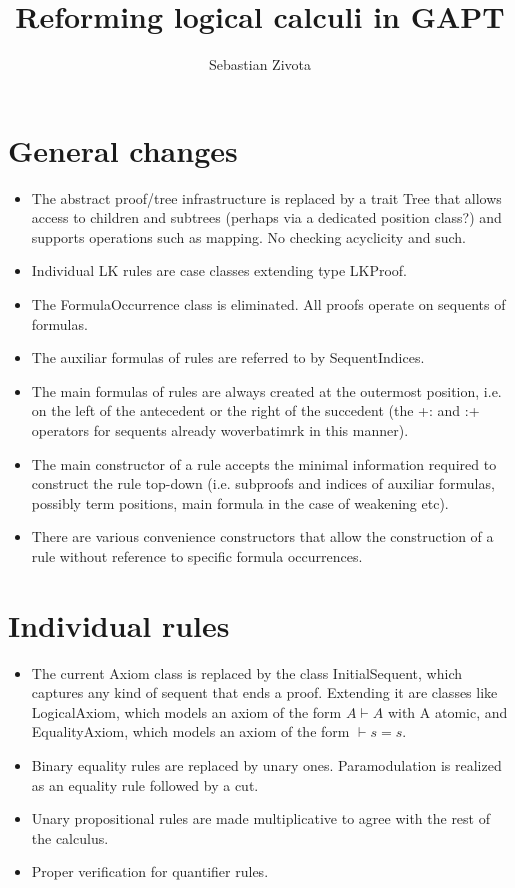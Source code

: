 \documentclass[11pt,a4paper]{article}
\title{Reforming logical calculi in GAPT}
\author{Sebastian Zivota}
\begin{document}
%
\maketitle
%
\section{General changes}
\begin{itemize}
 \item The abstract proof/tree infrastructure is replaced by a trait Tree that allows access to children and subtrees (perhaps via a dedicated position class?) and supports operations such as mapping. No checking acyclicity and such.
 \item Individual LK rules are case classes extending type LKProof.
 \item The FormulaOccurrence class is eliminated. All proofs operate on sequents of formulas.
 \item The auxiliar formulas of rules are referred to by SequentIndices.
 \item The main formulas of rules are always created at the outermost position, i.e. on the left of the antecedent or the right of the succedent (the +: and :+ operators for sequents already woverbatimrk in this manner).
 \item The main constructor of a rule accepts the minimal information required to construct the rule top-down (i.e. subproofs and indices of auxiliar formulas, possibly term positions, main formula in the case of weakening etc).
 \item There are various convenience constructors that allow the construction of a rule without reference to specific formula occurrences.
\end{itemize}

\section{Individual rules}
\begin{itemize}
\item The current Axiom class is replaced by the class InitialSequent, which captures any kind of sequent that ends a proof. Extending it are classes like LogicalAxiom, which models an axiom of the form $A \vdash A$ with A atomic, and EqualityAxiom, which models an axiom of the form $\vdash s = s$.
\item Binary equality rules are replaced by unary ones. Paramodulation is realized as an equality rule followed by a cut.
\item Unary propositional rules are made multiplicative to agree with the rest of the calculus.
\item Proper verification for quantifier rules.
\end{itemize}
\end{document}
